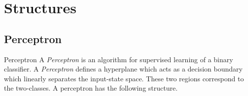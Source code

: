 \documentclass[11pt,a4paper]{article}
\begin{document}
\section{Structures} \label{sec_Structures}

\subsection{Perceptron} \label{sec_Perceptron}

  \begin{definition}{Perceptron}
    A \textit{Perceptron} is an algorithm for supervised learning of a binary classifier. A \textit{Perceptron} defines a hyperplane which acts as a decision boundary which linearly separates the input-state space. These two regions correspond to the two-classes. A perceptron has the following structure.

    \begin{center}
\end{center}
\end{definition}
\end{document}

